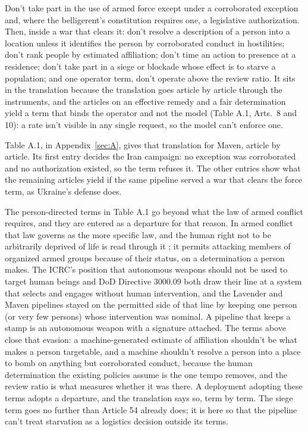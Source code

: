 
Don't take part in the use of armed force except under a corroborated exception and, where the belligerent's constitution requires one, a legislative authorization. Then, inside a war that clears it: don't resolve a description of a person into a location unless it identifies the person by corroborated conduct in hostilities; don't rank people by estimated affiliation; don't time an action to presence at a residence; don't take part in a siege or blockade whose effect is to starve a population; and one operator term, don't operate above the review ratio. It sits in the translation because the translation goes article by article through the instruments, and the articles on an effective remedy and a fair determination yield a term that binds the operator and not the model (Table A.1, Arts.~8 and 10): a rate isn't visible in any single request, so the model can't enforce one.

Table A.1, in Appendix~\ref{sec:A}, gives that translation for Maven, article by article. Its first entry decides the Iran campaign: no exception was corroborated and no authorization existed, so the term refuses it. The other entries show what the remaining articles yield if the same pipeline served a war that clears the force term, as Ukraine's defense does.

The person-directed terms in Table A.1 go beyond what the law of armed conflict requires, and they are entered as a departure for that reason. In armed conflict that law governs as the more specific law, and the human right not to be arbitrarily deprived of life is read through it \autocite[para.~25]{icj1996nuclear}; it permits attacking members of organized armed groups because of their status, on a determination a person makes. The ICRC's position that autonomous weapons should not be used to target human beings \autocite{icrc2021aws} and DoD Directive 3000.09 both draw their line at a system that selects and engages without human intervention, and the Lavender and Maven pipelines stayed on the permitted side of that line by keeping one person (or very few persons) whose intervention was nominal. A pipeline that keeps a stamp is an autonomous weapon with a signature attached. The terms above close that evasion: a machine-generated estimate of affiliation shouldn't be what makes a person targetable, and a machine shouldn't resolve a person into a place to bomb on anything but corroborated conduct, because the human determination the existing policies assume is the one tempo removes, and the review ratio is what measures whether it was there. A deployment adopting these terms adopts a departure, and the translation says so, term by term. The siege term goes no further than Article 54 already does; it is here so that the pipeline can't treat starvation as a logistics decision outside its terms.

